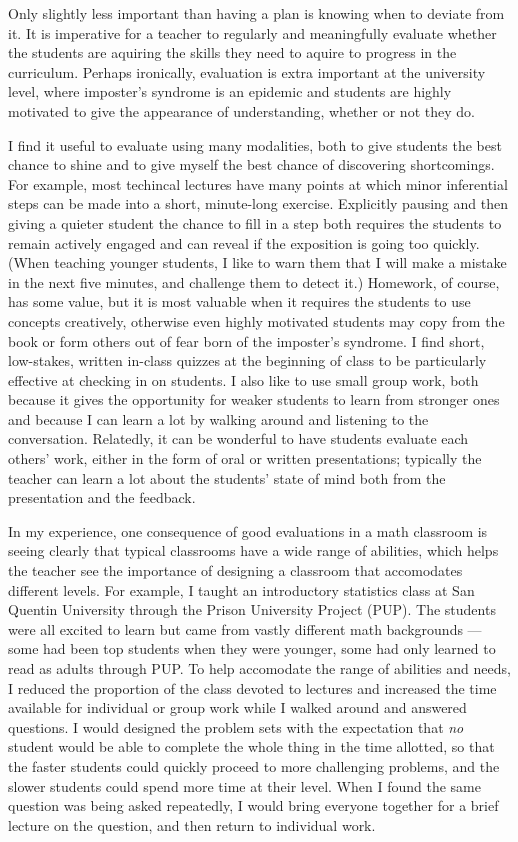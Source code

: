 \documentclass{article}
\begin{document}
Only slightly less important than having a plan is knowing when to deviate from
it.  It is imperative for a teacher to regularly and meaningfully evaluate
whether the students are aquiring the skills they need to aquire to progress in
the curriculum.  Perhaps ironically, evaluation is extra important at the
university level, where imposter's syndrome is an epidemic and students are
highly motivated to give the appearance of understanding, whether or not they
do.

I find it useful to evaluate using many modalities, both to give students the
best chance to shine and to give myself the best chance of discovering
shortcomings.  For example, most techincal lectures have many points at which
minor inferential steps can be made into a short, minute-long exercise.
Explicitly pausing and then giving a quieter student the chance to fill in a
step both requires the students to remain actively engaged and can reveal if the
exposition is going too quickly.  (When teaching younger students, I like to
warn them that I will make a mistake in the next five minutes, and challenge
them to detect it.)  Homework, of course, has some value, but it is most
valuable when it requires the students to use concepts creatively, otherwise
even highly motivated students may copy from the book or form others out of fear
born of the imposter's syndrome.  I find short, low-stakes, written in-class
quizzes at the beginning of class to be particularly effective at checking in on
students.  I also like to use small group work, both because it gives the
opportunity for weaker students to learn from stronger ones and because I can
learn a lot by walking around and listening to the conversation. Relatedly, it
can be wonderful to have students evaluate each others' work, either in the form
of oral or written presentations; typically the teacher can learn a lot about
the students' state of mind both from the presentation and the feedback.

In my experience, one consequence of good evaluations in a math classroom is
seeing clearly that typical classrooms have a wide range of abilities, which
helps the teacher see the importance of designing a classroom that accomodates
different levels. For example, I taught an introductory statistics class at San
Quentin University through the Prison University Project (PUP).  The students
were all excited to learn but came from vastly different math backgrounds ---
some had been top students when they were younger, some had only learned to read
as adults through PUP.  To help accomodate the range of abilities and needs, I
reduced the proportion of the class devoted to lectures and increased the time
available for individual or group work while I walked around and answered
questions.  I would designed the problem sets with the expectation that
\emph{no} student would be able to complete the whole thing in the time
allotted, so that the faster students could quickly proceed to more challenging
problems, and the slower students could spend more time at their level.  When I
found the same question was being asked repeatedly, I would bring everyone
together for a brief lecture on the question, and then return to individual
work.
\end{document}
